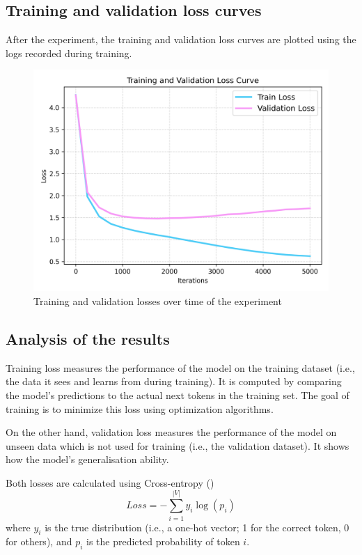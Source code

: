 \documentclass{article} %
\begin{document}
\subsection{Training and validation loss curves}
After the experiment, the training and validation loss curves are plotted using the logs recorded during training. 
\begin{figure}[H]
    \centering
      \includegraphics[width=1\linewidth]{loss_curve.png}
    \caption{Training and validation losses over time of the experiment}
    \label{fig:enter-label}
\end{figure}

\subsection{Analysis of the results}
Training loss measures the performance of the model on the training dataset (i.e., the data it sees and learns from during training). It is computed by comparing the model's predictions to the actual next tokens in the training set. The goal of training is to minimize this loss using optimization algorithms.

On the other hand, validation loss measures the performance of the model on unseen data which is not used for training (i.e., the validation dataset). It shows how the model's generalisation ability.

Both losses are calculated using Cross-entropy (\cite{goodfellow2016deep})
\[
Loss = -\sum_{i=1}^{|V|} y_i \log(p_i)
\]
where \( y_i \) is the true distribution (i.e., a one-hot vector; 1 for the correct token, 0 for others), and \( p_i \) is the predicted probability of token \( i \).
\end{document}
